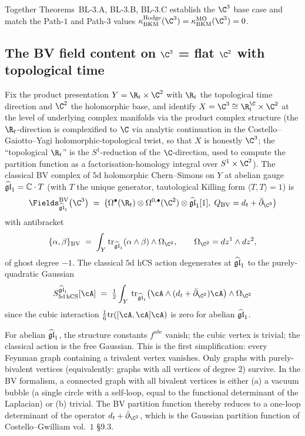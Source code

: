 Together Theorems~BL-$3$.A, BL-$3$.B, BL-$3$.C establish the
$\C^3$ base case and match the Path-$1$ and Path-$3$ values
$\kBKM^{\mathrm{Hodge}}(\C^3) = \kBKM^{\mathrm{MO}}(\C^3) = 0$.

\subsection*{The BV field content on $\C^3$ = flat $\C^2$ with topological time}

\begin{definition}[BV field content at $X = \C^3$, $\frakg = \ghat$]
\label{def:bl-bv-c3-field-content}
\ClaimStatusDefinitional
Fix the product presentation $Y = \R_t\times\C^2$ with $\R_t$ the
topological time direction and $\C^2$ the holomorphic base, and
identify $X = \C^3 \cong \R_t^{\C}\times\C^2$ at the level of
underlying complex manifolds via the product complex structure
(the $\R_t$-direction is complexified to $\C$ via analytic
continuation in the Costello--Gaiotto--Yagi holomorphic-topological
twist, so that $X$ is honestly $\C^3$; the ``topological $\R_t$''
is the $S^1$-reduction of the $\C$-direction, used to compute the
partition function as a factorisation-homology integral over
$S^1\times\C^2$).
The classical BV complex of $5$d holomorphic Chern--Simons on $Y$ at
abelian gauge $\widehat{\mathfrak{gl}}_1 = \mathbb{C}\cdot T$ (with $T$ the unique
generator, tautological Killing form $\langle T, T\rangle = 1$) is
\[
  \Fields^\BV_{\ghat}\bigl(\C^3\bigr)
  \;=\;
  \bigl(\Omega^\bullet(\R_t)\otimes \Omega^{0,\bullet}(\C^2)\otimes \ghat[1],\;
  Q_\BV = d_t + \bar\partial_{\C^2}\bigr)
\]
with antibracket
\[
  \{\alpha, \beta\}_\BV
  \;=\; \int_Y \mathrm{tr}_{\ghat}(\alpha\wedge\beta)\wedge \Omega_{\C^2},
  \qquad
  \Omega_{\C^2} = dz^1\wedge dz^2,
\]
of ghost degree $-1$. The classical $5$d hCS action degenerates at
$\widehat{\mathfrak{gl}}_1$ to the purely-quadratic Gaussian
\[
  S_{5\mathrm{d\,hCS}}^{\ghat}[\cA]
  \;=\;
  \tfrac{1}{2}\int_Y\, \mathrm{tr}_{\ghat}\bigl(\cA\wedge (d_t + \bar\partial_{\C^2})\cA\bigr)\wedge
  \Omega_{\C^2}
\]
since the cubic interaction $\tfrac{1}{6}\mathrm{tr}([\cA,\cA]\cA)$ is
zero for abelian $\widehat{\mathfrak{gl}}_1$.
\end{definition}

\begin{remark}
\label{rem:bl-bv-c3-gaussian}
For abelian $\widehat{\mathfrak{gl}}_1$, the structure constants $f^{abc}$ vanish; the
cubic vertex is trivial; the classical action is the free Gaussian.
This is the first simplification: every Feynman graph containing a
trivalent vertex vanishes. Only graphs with purely-bivalent vertices
(equivalently: graphs with all vertices of degree $2$) survive. In
the BV formalism, a connected graph with all bivalent vertices is
either (a) a vacuum bubble (a single circle with a self-loop, equal
to the functional determinant of the Laplacian) or (b) trivial. The
BV partition function thereby reduces to a one-loop determinant of
the operator $d_t + \bar\partial_{\C^2}$, which is the Gaussian
partition function of Costello--Gwilliam vol.\ $1$ \S$9.3$.
\end{remark}

